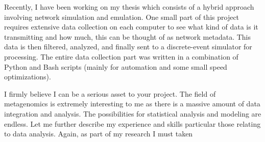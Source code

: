 \documentclass[11pt,a4paper,sans]{moderncv}        %
\begin{document}
Recently, I have been working on my thesis which consists of a hybrid approach involving network
simulation and emulation. One small part of this project requires extensive data collection on each
computer to see what kind of data is it transmitting and how much, this can be thought of as
network metadata. This data is then filtered, analyzed, and finally sent to a discrete-event 
simulator for processing. The entire data collection part was written in a combination of 
Python and Bash scripts (mainly for automation and some small speed optimizations).

I firmly believe I can be a serious asset to your project. The field of metagenomics is
extremely interesting to me as there is a massive amount of data integration and analysis. The
possibilities for statistical analysis and modeling are endless. Let me further describe my
experience and skills particular those relating to data analysis. Again, as part of my research
I must taken
\end{document}
